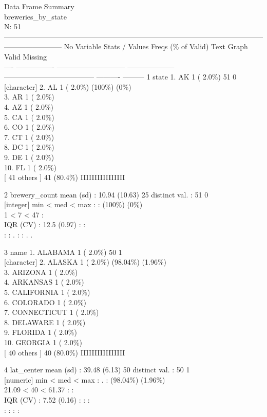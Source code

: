 \documentclass[]{article}
\begin{document}
Data Frame Summary\\
breweries\_by\_state\\
N: 51\\
------------------------------------------------------------------------------------------------------------------------------------
No Variable Stats / Values Freqs (\% of Valid) Text Graph Valid
Missing\\
---- ---------------- ----------------------------- --------------------
-------------------------------------- ---------- --------- 1 state 1.
AK 1 ( 2.0\%) 51 0\\
{[}character{]} 2. AL 1 ( 2.0\%) (100\%) (0\%)\\
3. AR 1 ( 2.0\%)\\
4. AZ 1 ( 2.0\%)\\
5. CA 1 ( 2.0\%)\\
6. CO 1 ( 2.0\%)\\
7. CT 1 ( 2.0\%)\\
8. DC 1 ( 2.0\%)\\
9. DE 1 ( 2.0\%)\\
10. FL 1 ( 2.0\%)\\
{[} 41 others {]} 41 (80.4\%) IIIIIIIIIIIIIIII

2 brewery\_count mean (sd) : 10.94 (10.63) 25 distinct val. : 51 0\\
{[}integer{]} min \textless{} med \textless{} max : : (100\%) (0\%)\\
1 \textless{} 7 \textless{} 47 :\\
IQR (CV) : 12.5 (0.97) : :\\
: : . : : . .

3 name 1. ALABAMA 1 ( 2.0\%) 50 1\\
{[}character{]} 2. ALASKA 1 ( 2.0\%) (98.04\%) (1.96\%)\\
3. ARIZONA 1 ( 2.0\%)\\
4. ARKANSAS 1 ( 2.0\%)\\
5. CALIFORNIA 1 ( 2.0\%)\\
6. COLORADO 1 ( 2.0\%)\\
7. CONNECTICUT 1 ( 2.0\%)\\
8. DELAWARE 1 ( 2.0\%)\\
9. FLORIDA 1 ( 2.0\%)\\
10. GEORGIA 1 ( 2.0\%)\\
{[} 40 others {]} 40 (80.0\%) IIIIIIIIIIIIIIII

4 lat\_center mean (sd) : 39.48 (6.13) 50 distinct val. : 50 1\\
{[}numeric{]} min \textless{} med \textless{} max : . : (98.04\%)
(1.96\%)\\
21.09 \textless{} 40 \textless{} 61.37 : :\\
IQR (CV) : 7.52 (0.16) : : :\\
: : : :
\end{document}
